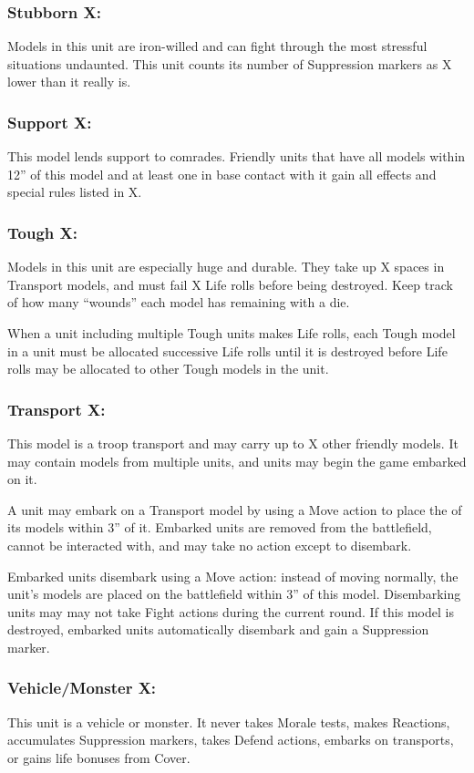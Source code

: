 \begin{multicols}{2}
\subsubsection*{Stubborn X:} Models in this unit are iron-willed and can fight through the most stressful situations undaunted. This unit counts its number of Suppression markers as X lower than it really is.

\subsubsection*{Support X:} This model lends support to comrades. Friendly units that have all models within 12'' of this model and at least one in base contact with it gain all effects and special rules listed in X.

\subsubsection*{Tough X:} Models in this unit are especially huge and durable. They take up X spaces in Transport models, and must fail X Life rolls before being destroyed. Keep track of how many ``wounds'' each model has remaining with a die.

When a unit including multiple Tough units makes Life rolls, each Tough model in a unit must be allocated successive Life rolls until it is destroyed before Life rolls may be allocated to other Tough models in the unit.

\subsubsection*{Transport X:} This model is a troop transport and may carry up to X other friendly models. It may contain models from multiple units, and units may begin the game embarked on it.

A unit may embark on a Transport model by using a Move action to place the of its models within 3'' of it. Embarked units are removed from the battlefield, cannot be interacted with, and may take no action except to disembark.

Embarked units disembark using a Move action: instead of moving normally, the unit's models are placed on the battlefield within 3'' of this model. Disembarking units may may not take Fight actions during the current round. If this model is destroyed, embarked units automatically disembark and gain a Suppression marker.

\subsubsection*{Vehicle/Monster X:} This unit is a vehicle or monster. It never takes Morale tests, makes Reactions, accumulates Suppression markers, takes Defend actions, embarks on transports, or gains life bonuses from Cover.


\end{multicols}
